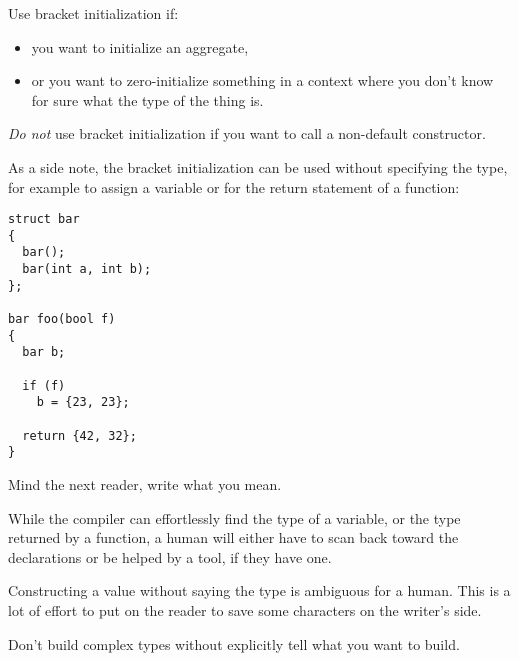 \begin{guideline}
  Use bracket initialization if:
  \begin{itemize}
  \item you want to initialize an aggregate,
  \item or you want to zero-initialize something in a context where
    you don't know for sure what the type of the thing is.
  \end{itemize}

  \emph{Do not} use bracket initialization if you want to call a
  non-default constructor.
\end{guideline}

As a side note, the bracket initialization can be used without
specifying the type, for example to assign a variable or for the
return statement of a function:

\begin{lstlisting}
struct bar
{
  bar();
  bar(int a, int b);
};

bar foo(bool f)
{
  bar b;

  if (f)
    b = {23, 23};

  return {42, 32};
}
\end{lstlisting}

\begin{guideline}
  Mind the next reader, write what you mean.

  While the compiler can effortlessly find the type of a variable, or
  the type returned by a function, a human will either have to scan
  back toward the declarations or be helped by a tool, if they have
  one.

  Constructing a value without saying the type is ambiguous for a
  human. This is a lot of effort to put on the reader to save some
  characters on the writer's side.

  Don't build complex types without explicitly tell what you want to
  build.
\end{guideline}
